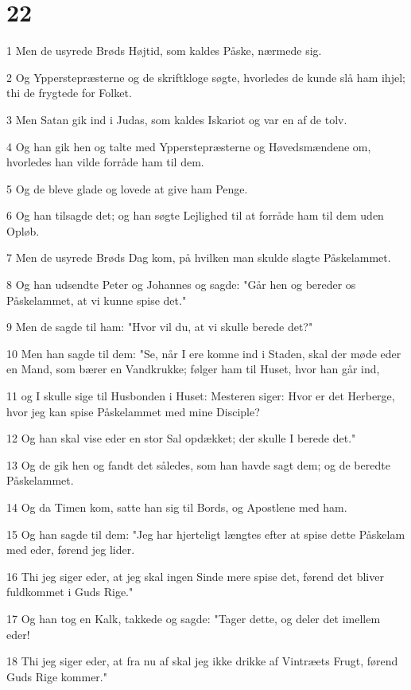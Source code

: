 \chapter{22}

\par 1 Men de usyrede Brøds Højtid, som kaldes Påske, nærmede sig.
\par 2 Og Ypperstepræsterne og de skriftkloge søgte, hvorledes de kunde slå ham ihjel; thi de frygtede for Folket.
\par 3 Men Satan gik ind i Judas, som kaldes Iskariot og var en af de tolv.
\par 4 Og han gik hen og talte med Ypperstepræsterne og Høvedsmændene om, hvorledes han vilde forråde ham til dem.
\par 5 Og de bleve glade og lovede at give ham Penge.
\par 6 Og han tilsagde det; og han søgte Lejlighed til at forråde ham til dem uden Opløb.
\par 7 Men de usyrede Brøds Dag kom, på hvilken man skulde slagte Påskelammet.
\par 8 Og han udsendte Peter og Johannes og sagde: "Går hen og bereder os Påskelammet, at vi kunne spise det."
\par 9 Men de sagde til ham: "Hvor vil du, at vi skulle berede det?"
\par 10 Men han sagde til dem: "Se, når I ere komne ind i Staden, skal der møde eder en Mand, som bærer en Vandkrukke; følger ham til Huset, hvor han går ind,
\par 11 og I skulle sige til Husbonden i Huset: Mesteren siger: Hvor er det Herberge, hvor jeg kan spise Påskelammet med mine Disciple?
\par 12 Og han skal vise eder en stor Sal opdækket; der skulle I berede det."
\par 13 Og de gik hen og fandt det således, som han havde sagt dem; og de beredte Påskelammet.
\par 14 Og da Timen kom, satte han sig til Bords, og Apostlene med ham.
\par 15 Og han sagde til dem: "Jeg har hjerteligt længtes efter at spise dette Påskelam med eder, førend jeg lider.
\par 16 Thi jeg siger eder, at jeg skal ingen Sinde mere spise det, førend det bliver fuldkommet i Guds Rige."
\par 17 Og han tog en Kalk, takkede og sagde: "Tager dette, og deler det imellem eder!
\par 18 Thi jeg siger eder, at fra nu af skal jeg ikke drikke af Vintræets Frugt, førend Guds Rige kommer."
